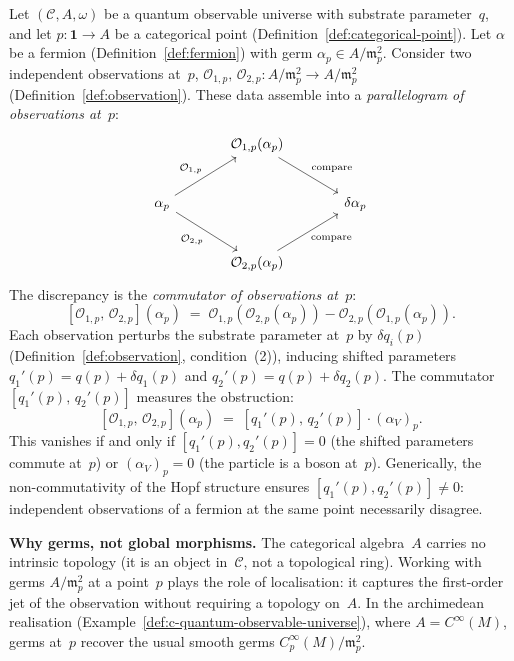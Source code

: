 \begin{remark}
\label{rem:two-observer-parallelogram}
Let $(\mathcal{C}, A, \omega)$ be a quantum observable universe with
substrate parameter~$q$, and let
$p \colon \mathbf{1} \to A$ be a categorical point
(Definition~\ref{def:categorical-point}).  Let
$\alpha$ be a fermion (Definition~\ref{def:fermion}) with germ
$\alpha_p \in A / \mathfrak{m}_p^2$.
Consider two independent observations at~$p$,
$\mathcal{O}_{1,p},\, \mathcal{O}_{2,p} \colon
A / \mathfrak{m}_p^2 \to A / \mathfrak{m}_p^2$
(Definition~\ref{def:observation}).  These data
assemble into a \emph{parallelogram of observations at~$p$}:
\begin{equation}\label{eq:observation-parallelogram}
\begin{tikzcd}[row sep=2.5em, column sep=3.5em]
  & \mathcal{O}_{1,p}(\alpha_p) \arrow[dr, "\text{compare}"] & \\
  \alpha_p \arrow[ur, "\mathcal{O}_{1,p}"]
           \arrow[dr, "\mathcal{O}_{2,p}"']
  & & \delta\alpha_p \\
  & \mathcal{O}_{2,p}(\alpha_p) \arrow[ur, "\text{compare}"'] &
\end{tikzcd}
\end{equation}
The discrepancy is the \emph{commutator of observations at~$p$}:
\[
  [\mathcal{O}_{1,p},\, \mathcal{O}_{2,p}](\alpha_p)
  \;=\;
  \mathcal{O}_{1,p}(\mathcal{O}_{2,p}(\alpha_p))
  - \mathcal{O}_{2,p}(\mathcal{O}_{1,p}(\alpha_p)).
\]
Each observation perturbs the substrate parameter at~$p$ by
$\delta q_i(p)$ (Definition~\ref{def:observation}, condition~(2)),
inducing shifted parameters $q_1'(p) = q(p) + \delta q_1(p)$
and $q_2'(p) = q(p) + \delta q_2(p)$.  The commutator
$[q_1'(p),\, q_2'(p)]$ measures the obstruction:
\[
  [\mathcal{O}_{1,p},\, \mathcal{O}_{2,p}](\alpha_p)
  \;=\;
  [q_1'(p),\, q_2'(p)] \cdot (\alpha_V)_p.
\]
This vanishes if and only if $[q_1'(p), q_2'(p)] = 0$ (the shifted
parameters commute at~$p$) or $(\alpha_V)_p = 0$ (the particle is a
boson at~$p$).  Generically, the non-commutativity of the Hopf
structure ensures $[q_1'(p), q_2'(p)] \neq 0$: independent
observations of a fermion at the same point necessarily disagree.

\medskip\noindent\textbf{Why germs, not global morphisms.}\;
The categorical algebra~$A$ carries no intrinsic topology (it is an
object in~$\mathcal{C}$, not a topological ring).  Working with germs
$A / \mathfrak{m}_p^2$ at a point~$p$ plays the role of localisation:
it captures the first-order jet of the observation without requiring a
topology on~$A$.  In the archimedean realisation
(Example~\ref{def:c-quantum-observable-universe}), where
$A = C^{\infty}(M)$, germs at~$p$ recover the usual smooth germs
$C^{\infty}_p(M) / \mathfrak{m}_p^2$.
\end{remark}

